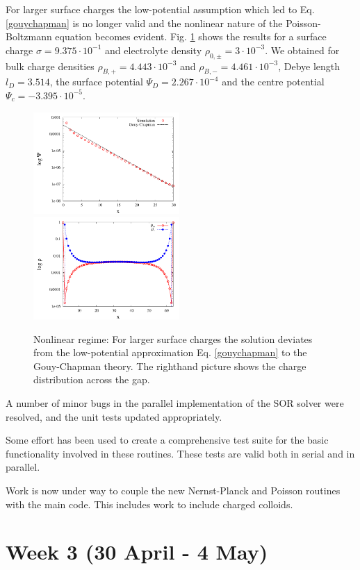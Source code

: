 \documentclass[aps,pre,preprint,groupedaddress]{revtex4-1}
\newcommand{\e}[1]{\cdot10^{#1}}
\begin{document}
For larger surface charges the low-potential assumption which led to Eq. \ref{gouychapman}
is no longer valid and the nonlinear nature of the Poisson-Boltzmann 
equation becomes evident.
Fig. \ref{fig2} shows the results for a surface charge $\sigma=9.375\e{-1}$
and electrolyte density $\rho_{0,\pm}=3\e{-3}$. We obtained for   
bulk charge densities $\rho_{B,+}=4.443\e{-3}$ and $\rho_{B,-}=4.461\e{-3}$, 
Debye length $l_D=3.514$, the surface potential $\Psi_D=2.267\e{-4}$
and the centre potential $\Psi_c=-3.395\e{-5}$. 

\begin{figure}[h!t]
\includegraphics[width=0.495\textwidth]{test3.pdf}
\includegraphics[width=0.495\textwidth]{test3-rho.pdf}
\caption{Nonlinear regime: For larger surface charges the solution deviates from the low-potential approximation Eq. \ref{gouychapman} to the Gouy-Chapman theory. The righthand picture shows the charge distribution across the gap.} 
\label{fig2} 
\end{figure}

A number of minor bugs in the parallel implementation of the
SOR solver were resolved, and the unit tests updated appropriately.

Some effort has been used to create a comprehensive test suite
for the basic functionality involved in these routines. These
tests are valid both in serial and in parallel.

Work is now under way to couple the new Nernst-Planck and
Poisson routines with the main code. This includes work to
include charged colloids.


\section{Week 3 (30 April - 4 May)}
\end{document}
